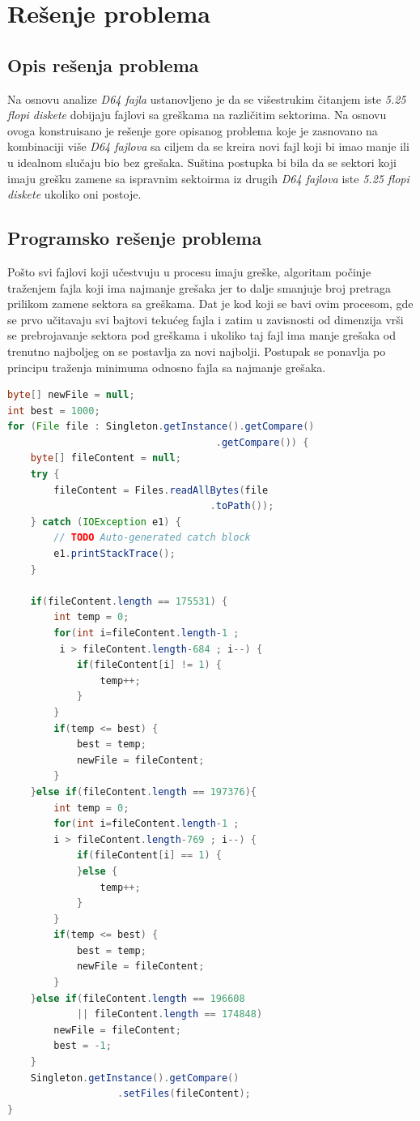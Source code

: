 \section{Rešenje problema}
\subsection{Opis rešenja problema}

Na osnovu analize \textit{D64 fajla} ustanovljeno je da se višestrukim čitanjem iste \textit{5.25 flopi diskete} dobijaju fajlovi sa greškama na različitim sektorima. Na osnovu ovoga konstruisano je rešenje gore opisanog problema koje je zasnovano na kombinaciji više \textit{D64 fajlova} sa ciljem da se kreira novi fajl koji bi imao manje ili u idealnom slučaju bio  bez grešaka. Suština postupka bi bila da se sektori koji imaju grešku zamene sa ispravnim sektoirma iz drugih \textit{D64 fajlova} iste \textit{5.25 flopi diskete} ukoliko oni postoje.

\subsection{Programsko rešenje problema}

Pošto svi fajlovi koji učestvuju u procesu imaju greške, algoritam počinje traženjem fajla koji ima najmanje grešaka jer to dalje smanjuje broj pretraga prilikom zamene sektora sa greškama. Dat je kod koji se bavi ovim procesom, gde se prvo učitavaju svi bajtovi tekućeg fajla i zatim u zavisnosti od dimenzija vrši se prebrojavanje sektora pod greškama i ukoliko taj fajl ima manje grešaka od trenutno najboljeg on se postavlja za novi najbolji. Postupak se ponavlja  po principu traženja minimuma odnosno fajla sa najmanje grešaka.

\begin{lstlisting}[language=Java]
byte[] newFile = null;
int best = 1000;
for (File file : Singleton.getInstance().getCompare()
                                    .getCompare()) {
    byte[] fileContent = null;
    try {
    	fileContent = Files.readAllBytes(file
    	                           .toPath());
    } catch (IOException e1) {
    	// TODO Auto-generated catch block
    	e1.printStackTrace();
    }
    
    if(fileContent.length == 175531) {
    	int temp = 0;
    	for(int i=fileContent.length-1 ; 
    	 i > fileContent.length-684 ; i--) {
            if(fileContent[i] != 1) {
            	temp++;
            }
        }
    	if(temp <= best) {
    		best = temp;
    		newFile = fileContent;
    	}
    }else if(fileContent.length == 197376){
    	int temp = 0;
    	for(int i=fileContent.length-1 ; 
    	i > fileContent.length-769 ; i--) {
            if(fileContent[i] == 1) {
            }else {
            	temp++;
            }
        }
    	if(temp <= best) {
    		best = temp;
    		newFile = fileContent;
    	}
    }else if(fileContent.length == 196608 
            || fileContent.length == 174848)
    	newFile = fileContent;
    	best = -1;
    }	
    Singleton.getInstance().getCompare()
                   .setFiles(fileContent);
}
\end{lstlisting}

